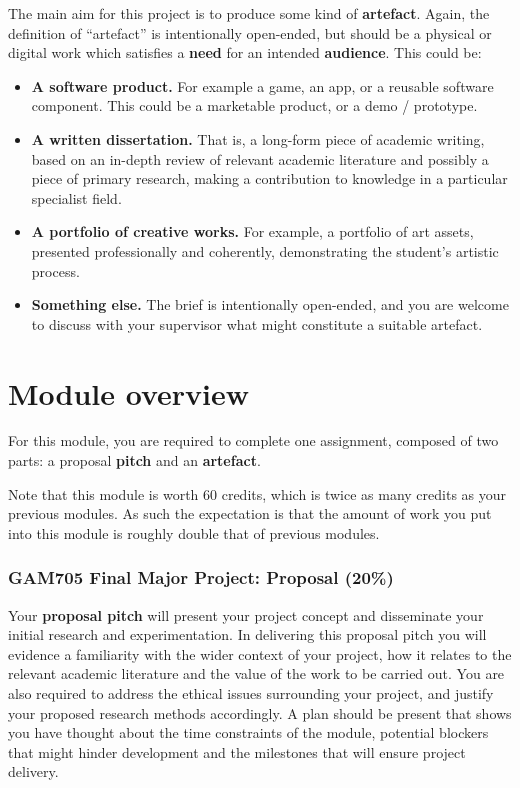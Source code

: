 The main aim for this project is to produce some kind of \textbf{artefact}. Again, the definition of ``artefact'' is intentionally open-ended,
but should be a physical or digital work which satisfies a \textbf{need} for an intended \textbf{audience}. This could be:

\begin{itemize}
    \item \textbf{A software product.} For example a game, an app, or a reusable software component. This could be a marketable product, or a demo / prototype.
    \item \textbf{A written dissertation.} That is, a long-form piece of academic writing, based on an in-depth review of relevant academic literature and possibly a piece of primary research,
        making a contribution to knowledge in a particular specialist field.
    \item \textbf{A portfolio of creative works.} For example, a portfolio of art assets, presented professionally and coherently, demonstrating the student's artistic process.
    \item \textbf{Something else.} The brief is intentionally open-ended, and you are welcome to discuss with your supervisor what might constitute a suitable artefact.
\end{itemize}

\section*{Module overview}

For this module, you are required to complete one assignment, composed of two parts: a proposal \textbf{pitch} and an \textbf{artefact}.

Note that this module is worth 60 credits, which is twice as many credits as your previous modules.
As such the expectation is that the amount of work you put into this module is roughly double that of previous modules.

\subsubsection*{GAM705 Final Major Project: Proposal (20\%)}

Your \textbf{proposal pitch} will present your project concept and disseminate your initial research and experimentation. In delivering this proposal pitch you will evidence a familiarity with the wider context of your project, how it relates to the relevant academic literature and the value of the work to be carried out. You are also required to address the ethical issues surrounding your project, and justify your proposed research methods accordingly. A plan should be present that shows you have thought about the time constraints of the module, potential blockers that might hinder development and the milestones that will ensure project delivery. 

